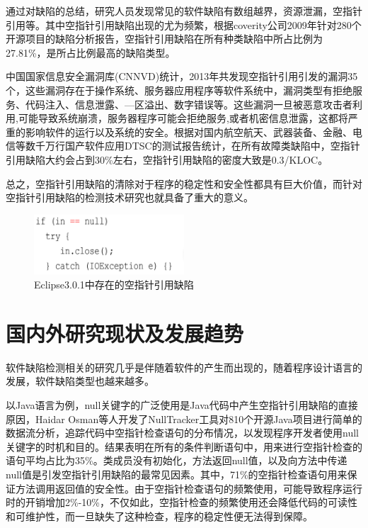 通过对缺陷的总结，研究人员发现常见的软件缺陷有数组越界，资源泄漏，空指针引用等。其中空指针引用缺陷出现的尤为频繁，根据coverity公司2009年针对280个开源项目的缺陷分析报告，空指针引用缺陷在所有种类缺陷中所占比例为27.81\%，是所占比例最高的缺陷类型\cite{coverity2009}。


中国国家信息安全漏洞库(CNNVD)统计，2013年共发现空指针引用引发的漏洞35个，这些漏洞存在于操作系统、服务器应用程序等软件系统中，漏洞类型有拒绝服务、代码注入、信息泄露、—区溢出、数字错误等。这些漏洞一旦被恶意攻击者利用,可能导致系统崩溃，服务器程序可能会拒绝服务,或者机密信息泄露，这都将严重的影响软件的运行以及系统的安全。根据对国内航空航天、武器装备、金融、电信等数千万行国产软件应用DTSC的测试报告统计，在所有故障类缺陷中，空指针引用缺陷大约会占到30\%左右，空指针引用缺陷的密度大致是0.3/KLOC。

总之，空指针引用缺陷的清除对于程序的稳定性和安全性都具有巨大价值，而针对空指针引用缺陷的检测技术研究也就具备了重大的意义。
 \begin{figure}
 \centering
 \includegraphics[width=0.50\textwidth]{figures/NullPointer1-1}
 \caption{Eclipse3.0.1中存在的空指针引用缺陷}\label{fig:figure1-1}
\end{figure}

\section{国内外研究现状及发展趋势}

软件缺陷检测相关的研究几乎是伴随着软件的产生而出现的，随着程序设计语言的发展，软件缺陷类型也越来越多。

以Java语言为例，null关键字的广泛使用是Java代码中产生空指针引用缺陷的直接原因，Haidar Osman等人开发了NullTracker\cite{osman2016tracking}工具对810个开源Java项目进行简单的数据流分析，追踪代码中空指针检查语句的分布情况，以发现程序开发者使用null关键字的时机和目的。结果表明在所有的条件判断语句中，用来进行空指针检查的语句平均占比为35\%。类成员没有初始化，方法返回null值，以及向方法中传递null值是引发空指针引用缺陷的最常见因素。其中，71\%的空指针检查语句用来保证方法调用返回值的安全性。由于空指针检查语句的频繁使用，可能导致程序运行时的开销增加2\%-10\%，不仅如此，空指针检查的频繁使用还会降低代码的可读性和可维护性，而一旦缺失了这种检查，程序的稳定性便无法得到保障。

